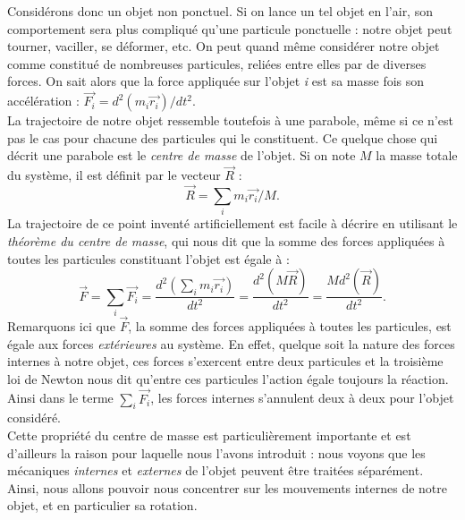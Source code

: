 Considérons donc un objet non ponctuel. Si on lance un tel objet en l'air, son comportement sera plus compliqué qu'une particule ponctuelle : notre objet peut tourner, vaciller, se déformer, etc. On peut quand même considérer notre objet comme constitué de nombreuses particules, reliées entre elles par de diverses forces. On sait alors que la force appliquée sur l'objet \textit{i} est sa masse fois son accélération : $\vec{F_i} = d^2(m_i\vec{r_i})/dt^2$. \\La trajectoire de notre objet ressemble toutefois à une parabole, même si ce n'est pas le cas pour chacune des particules qui le constituent. Ce quelque chose qui décrit une parabole est le \textit{centre de masse} de l'objet. Si on note $M$ la masse totale du système, il est définit par le vecteur $\vec{R}$ :
\begin{equation}
\vec{R} = \sum_i{m_i\vec{r_i}/M}.
\end{equation}
La trajectoire de ce point inventé artificiellement est facile à décrire en utilisant le \textit{théorème du centre de masse}, qui nous dit que la somme des forces appliquées à toutes les particules constituant l'objet est égale à :
\begin{equation}
\vec{F} = \sum_i{\vec{F_i}} = \frac{d^2(\sum_i{m_i\vec{r_i}})}{dt^2} = \frac{d^2(M\vec{R})}{dt^2} = \frac{Md^2(\vec{R})}{dt^2}.
\end{equation}
Remarquons ici que $\vec{F}$, la somme des forces appliquées à toutes les particules, est égale aux forces \textit{extérieures} au système. En effet, quelque soit la nature des forces internes à notre objet, ces forces s'exercent entre deux particules et la troisième loi de Newton nous dit qu'entre ces particules l'action égale toujours la réaction. Ainsi dans le terme $\sum_i{\vec{F_i}}$, les forces internes s'annulent deux à deux pour l'objet considéré.\\ Cette propriété du centre de masse est particulièrement importante et est d'ailleurs la raison pour laquelle nous l'avons introduit : nous voyons que les mécaniques \textit{internes} et \textit{externes} de l'objet peuvent être traitées séparément. Ainsi, nous allons pouvoir nous concentrer sur les mouvements internes de notre objet, et en particulier sa rotation.

